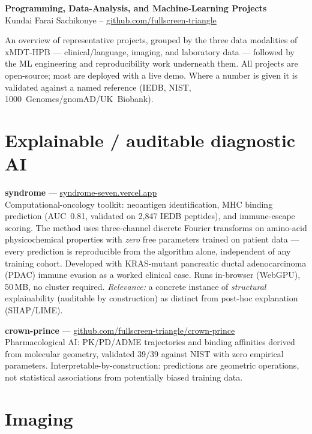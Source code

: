 \documentclass[11pt,a4paper]{article}
\begin{document}
\begin{center}
{\large\textbf{Programming, Data-Analysis, and Machine-Learning Projects}}\\[2pt]
Kundai Farai Sachikonye \quad--\quad
\href{https://github.com/fullscreen-triangle}{github.com/fullscreen-triangle}
\end{center}

\vspace{4pt}

An overview of representative projects, grouped by the three data modalities of
xMDT-HPB --- clinical/language, imaging, and laboratory data --- followed by the ML
engineering and reproducibility work underneath them. All projects are open-source;
most are deployed with a live demo. Where a number is given it is validated against
a named reference (IEDB, NIST, 1000~Genomes/gnomAD/UK~Biobank).

\section{Explainable / auditable diagnostic AI}

\textbf{syndrome} --- \href{https://syndrome-seven.vercel.app/tools}{syndrome-seven.vercel.app}\\
Computational-oncology toolkit: neoantigen identification, MHC binding prediction
(AUC~0.81, validated on 2{,}847 IEDB peptides), and immune-escape scoring. The
method uses three-channel discrete Fourier transforms on amino-acid physicochemical
properties with \emph{zero} free parameters trained on patient data --- every
prediction is reproducible from the algorithm alone, independent of any training
cohort. Developed with KRAS-mutant pancreatic ductal adenocarcinoma (PDAC) immune
evasion as a worked clinical case. Runs in-browser (WebGPU), 50\,MB, no cluster
required. \emph{Relevance:} a concrete instance of \emph{structural} explainability
(auditable by construction) as distinct from post-hoc explanation (SHAP/LIME).

\textbf{crown-prince} --- \href{https://github.com/fullscreen-triangle/crown-prince}{github.com/fullscreen-triangle/crown-prince}\\
Pharmacological AI: PK/PD/ADME trajectories and binding affinities derived from
molecular geometry, validated 39/39 against NIST with zero empirical parameters.
Interpretable-by-construction: predictions are geometric operations, not statistical
associations from potentially biased training data.

\section{Imaging}
\end{document}
